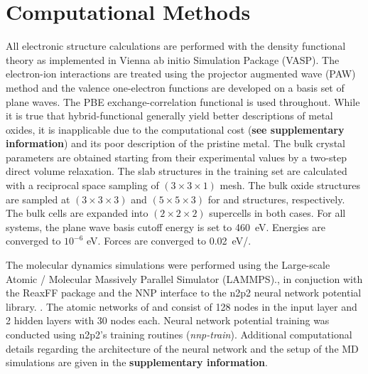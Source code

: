 \documentclass[manuscript=cmatex]{achemso}
\begin{document}
\section{Computational Methods}
All electronic structure calculations are performed with the density functional theory as implemented in Vienna ab initio Simulation Package (VASP)\cite{VASP:1994,VASP:1996,Kresse:1996}. The electron-ion interactions are treated using the projector augmented wave (PAW) method\cite{VASP:1999} and the valence one-electron functions are developed on a basis set of plane waves. The PBE exchange-correlation functional\cite{PBE:1996} is used throughout. While it is true that hybrid-functional generally yield better descriptions of metal oxides, it is inapplicable due to the computational cost (\textbf{see supplementary information}) and its poor description of the pristine metal. The bulk crystal parameters are obtained starting from their experimental values\cite{CRC:97} by a two-step direct volume relaxation. The slab structures in the training set are calculated with a reciprocal space sampling of $(3\times3\times1)$ mesh. The bulk oxide structures are sampled at $(3\times3\times3)$ and $(5\times5\times3)$ for  and  structures, respectively. The bulk cells are expanded into $(2\times2\times2)$ supercells in both cases. For all systems, the plane wave basis cutoff energy is set to \SI{460}{eV}. Energies are converged to $10^{-6}$ eV. Forces are converged to \SI{0.02}{eV/{\angstrom}}.

The molecular dynamics simulations were performed using the Large-scale Atomic / Molecular Massively Parallel Simulator (LAMMPS).\cite{thompson_lammps_2022}, in conjuction with the ReaxFF package\cite{aktulga_parallel_2012} and the NNP interface to the n2p2 neural network potential library. \cite{singraber_library-based_2019}. The atomic networks of  and  consist of 128 nodes in the input layer and 2 hidden layers with 30 nodes each. Neural network potential training was conducted using n2p2's training routines (\textit{nnp-train}).\cite{singraber_parallel_2019} Additional computational details regarding the architecture of the neural network and the setup of the MD simulations are given in the \textbf{supplementary information}.
\end{document}

